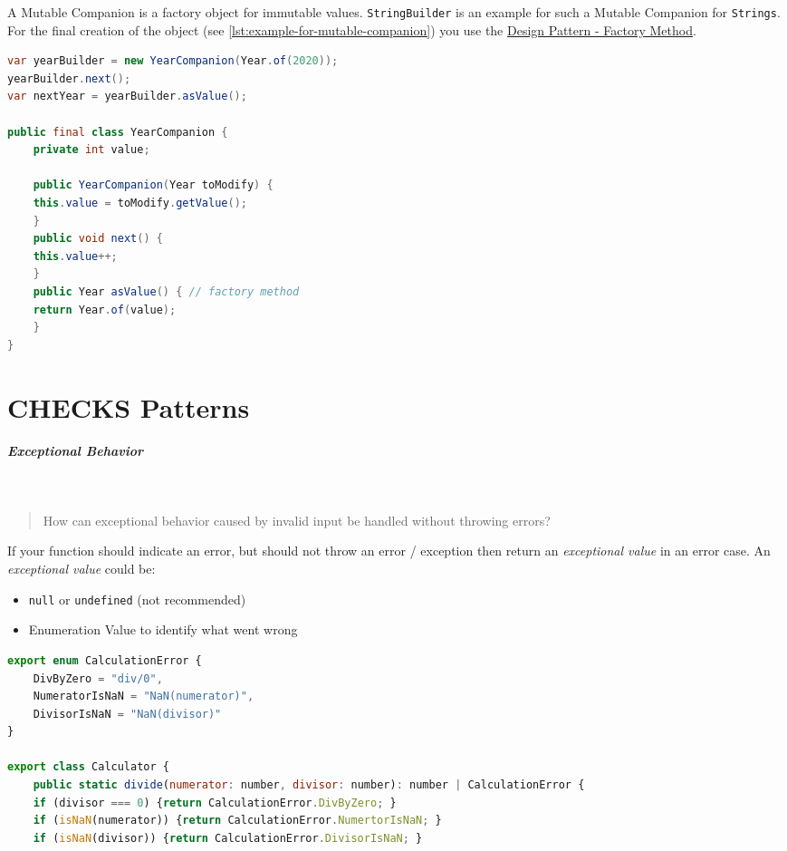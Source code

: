 \documentclass[8pt,twoside,landscape]{extarticle}
\begin{document}
\begin{multicols}{4}
A Mutable Companion is a factory object for immutable values.
\texttt{StringBuilder} is an example for such a Mutable Companion for \texttt{Strings}.
For the final creation of the object (see \autoref{lst:example-for-mutable-companion}) you use the \href{../../../roam/20220413195351-design_pattern_factory_method.org}{Design Pattern - Factory Method}.

\begin{lstlisting}[language=java,label=lst:example-for-mutable-companion,caption={Example for Mutable Companion},captionpos=b,numbers=none]
var yearBuilder = new YearCompanion(Year.of(2020));
yearBuilder.next();
var nextYear = yearBuilder.asValue();

public final class YearCompanion {
    private int value;

    public YearCompanion(Year toModify) {
	this.value = toModify.getValue();
    }
    public void next() {
	this.value++;
    }
    public Year asValue() { // factory method
	return Year.of(value);
    }
}
\end{lstlisting}
\section{CHECKS Patterns}
\label{sec:orgc220a81}
\subparagraph{Exceptional Behavior} \
\label{sec:org83498ee}
\begin{quote}
How can exceptional behavior caused by invalid input be handled without throwing errors?
\end{quote}

If your function should indicate an error, but should not throw an error / exception then return an \emph{exceptional value} in an error case.
An \emph{exceptional value} could be:
\begin{itemize}
\item \texttt{null} or \texttt{undefined} (not recommended)
\item Enumeration Value to identify what went wrong
\end{itemize}


\begin{lstlisting}[language=js,label=lst:example-for-exceptional-behavior,caption={Example for Exceptional Behavior},captionpos=b,numbers=none]
export enum CalculationError {
    DivByZero = "div/0",
    NumeratorIsNaN = "NaN(numerator)",
    DivisorIsNaN = "NaN(divisor)"
}

export class Calculator {
    public static divide(numerator: number, divisor: number): number | CalculationError {
	if (divisor === 0) {return CalculationError.DivByZero; }
	if (isNaN(numerator)) {return CalculationError.NumertorIsNaN; }
	if (isNaN(divisor)) {return CalculationError.DivisorIsNaN; }


\end{lstlisting}
\end{multicols}
\end{document}
